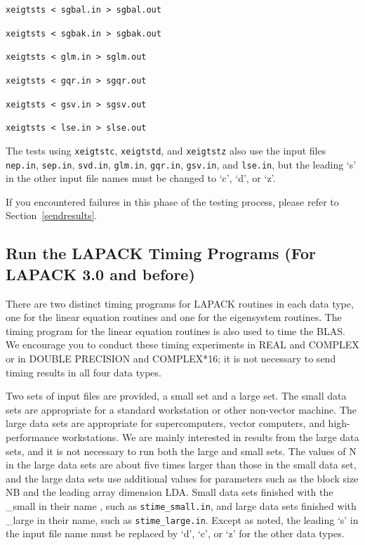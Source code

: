 \documentclass[11pt]{report}
\begin{document}
\begin{itemize}
\begin{list}{}{}
\item \texttt{xeigtsts  < sgbal.in > sgbal.out}
\item \texttt{xeigtsts  < sgbak.in > sgbak.out}
\item \texttt{xeigtsts  < glm.in > sglm.out}
\item \texttt{xeigtsts  < gqr.in > sgqr.out}
\item \texttt{xeigtsts  < gsv.in > sgsv.out}
\item \texttt{xeigtsts  < lse.in > slse.out}
\end{list}
The tests using \texttt{xeigtstc}, \texttt{xeigtstd}, and \texttt{xeigtstz} also
use the input files \texttt{nep.in}, \texttt{sep.in}, \texttt{svd.in},
\texttt{glm.in}, \texttt{gqr.in}, \texttt{gsv.in}, and \texttt{lse.in},
but the leading `s' in the other input file names must be changed
to `c', `d', or `z'.
\end{itemize}

If you encountered failures in this phase of the testing process, please
refer to Section~\ref{sendresults}.

\subsection{Run the LAPACK Timing Programs (For LAPACK 3.0 and before)}

There are two distinct timing programs for LAPACK routines
in each data type, one for the linear equation routines and
one for the eigensystem routines.  The timing program for the
linear equation routines is also used to time the BLAS.
We encourage you to conduct these timing experiments
in REAL and COMPLEX or in DOUBLE PRECISION and COMPLEX*16; it is
not necessary to send timing results in all four data types.

Two sets of input files are provided, a small set and a large set.
The small data sets are appropriate for a standard workstation or
other non-vector machine.
The large data sets are appropriate for supercomputers, vector
computers, and high-performance workstations.
We are mainly interested in results from the large data sets, and
it is not necessary to run both the large and small sets.
The values of N in the large data sets are about five times larger
than those in the small data set,
and the large data sets use additional values for parameters such as the
block size NB and the leading array dimension LDA.
Small data sets finished with the \_small in their name , such as
\texttt{stime\_small.in}, and large data sets finished with \_large in their name,
such as \texttt{stime\_large.in}.
Except as noted, the leading `s' in the input file name must be
replaced by `d', `c', or `z' for the other data types.
\end{document}

